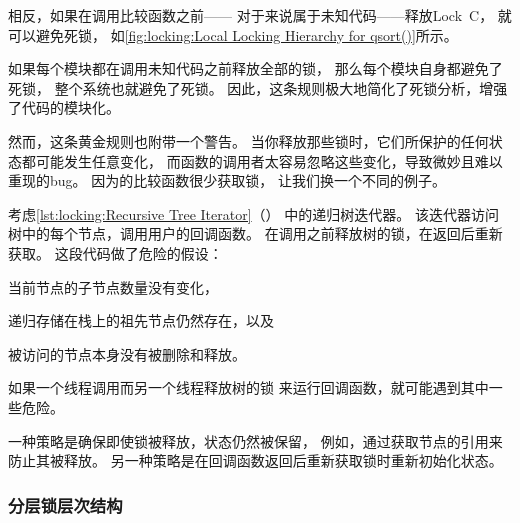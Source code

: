 相反，如果在调用比较函数之前——
对于来说属于未知代码——释放Lock~C，
就可以避免死锁，
如\cref{fig:locking:Local Locking Hierarchy for qsort()}所示。

如果每个模块都在调用未知代码之前释放全部的锁，
那么每个模块自身都避免了死锁，
整个系统也就避免了死锁。
因此，这条规则极大地简化了死锁分析，增强了代码的模块化。

然而，这条黄金规则也附带一个警告。
当你释放那些锁时，它们所保护的任何状态都可能发生任意变化，
而函数的调用者太容易忽略这些变化，导致微妙且难以重现的bug。
因为的比较函数很少获取锁，
让我们换一个不同的例子。

考虑\cref{lst:locking:Recursive Tree Iterator}（）
中的递归树迭代器。
该迭代器访问树中的每个节点，调用用户的回调函数。
在调用之前释放树的锁，在返回后重新获取。
这段代码做了危险的假设：
\begin{enumerate*}[(1)]
\item	当前节点的子节点数量没有变化，
\item	递归存储在栈上的祖先节点仍然存在，以及
\item	被访问的节点本身没有被删除和释放。
\end{enumerate*}
如果一个线程调用而另一个线程释放树的锁
来运行回调函数，就可能遇到其中一些危险。

\QuickQuizEnd

一种策略是确保即使锁被释放，状态仍然被保留，
例如，通过获取节点的引用来防止其被释放。
另一种策略是在回调函数返回后重新获取锁时重新初始化状态。

\begin{listing}

\caption{递归树迭代器}
\label{lst:locking:Recursive Tree Iterator}
\end{listing}

\subsubsection{分层锁层次结构}
\label{sec:locking:Layered Locking Hierarchies}

